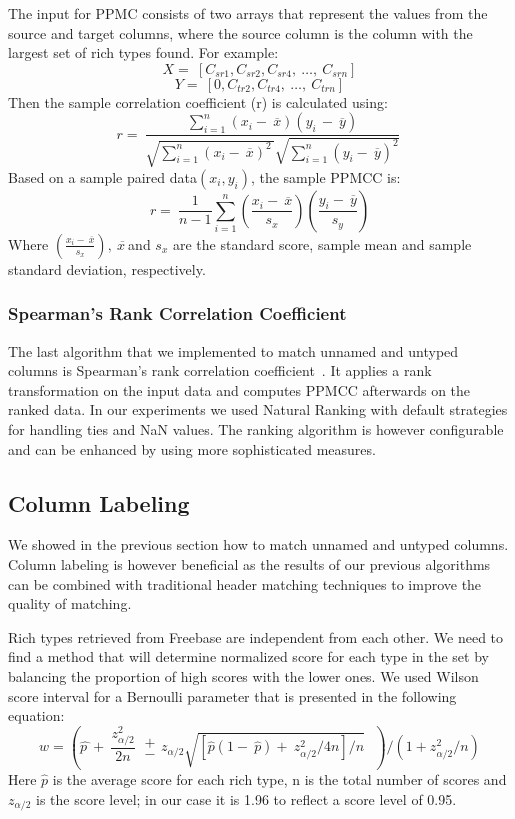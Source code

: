 \documentclass{sig-alternate}
\begin{document}
The input for PPMC consists of two arrays that represent the values from the source and target columns, where the source column is the column with the largest set of rich types found. For example:
\[X=\ \left[C_{sr1},C_{sr2},C_{sr4},\ \dots ,\ C_{srn}\right]\]
\[Y=\ \left[0,C_{tr2},C_{tr4},\ \dots ,\ C_{trn}\right]\]
Then the sample correlation coefficient (r) is calculated using:
\[r=\ \frac{\sum^n_{i=1}{\left(x_i-\ \overline{x}\right)\left(y_{i\ }-\ \overline{y}\right)}}{\sqrt{\sum^n_{i=1}{{\left(x_i-\ \overline{x}\right)}^{2\ }}}\sqrt{\sum^n_{i=1}{{\left(y_i-\ \overline{y}\right)}^2}}}\ \]
Based on a sample paired data$\left(x_i,y_i\right)$, the sample PPMCC is:
\[r=\ \frac{1}{n-1}\sum^n_{i=1}{\left(\frac{x_i-\ \overline{x}}{s_x}\right)}\left(\frac{y_i-\ \overline{y}}{s_y}\right)\]
Where $\left(\frac{x_i-\ \overline{x}}{s_x}\right),\ \overline{x\ }$and $s_x$ are the standard score, sample mean and sample standard deviation, respectively.


\subsubsection{Spearman's Rank Correlation Coefficient}
The last algorithm that we implemented to match unnamed and untyped columns is Spearman's rank correlation coefficient~\cite{books/daglib/0020904}. It applies a rank transformation on the input data and computes PPMCC afterwards on the ranked data. In our experiments we used Natural Ranking with default strategies for handling ties and NaN values. The ranking algorithm is however configurable and can be enhanced by using more sophisticated measures.


\subsection{Column Labeling}
We showed in the previous section how to match unnamed and untyped columns. Column labeling is however beneficial as the results of our previous algorithms can be combined with traditional header matching techniques to improve the quality of matching.

Rich types retrieved from Freebase are independent from each other. We need to find a method that will determine normalized score for each type in the set by balancing the proportion of high scores with the lower ones. We used Wilson score interval for a Bernoulli parameter that is presented in the following equation:
\[w={\left(\widehat{p\ }+\ \frac{z^2_{{\alpha }/{2}}}{2n}\  \begin{array}{c}
+ \\
- \end{array}
z_{{\alpha }/{2}}\sqrt{{\left[\hat{p}\left(1-\ \hat{p}\right)+\ {z^2_{{\alpha }/{2}}}/{4n}\right]}/{n}}\ \ \ \right)}/{\left(1+{z^2_{{\alpha }/{2}}}/{n}\right)}\]
Here $\hat{p}$ is the average score for each rich type, n is the total number of scores and $z_{{\alpha }/{2}}$ is the score level; in our case it is 1.96 to reflect a score level of 0.95.
\end{document}
